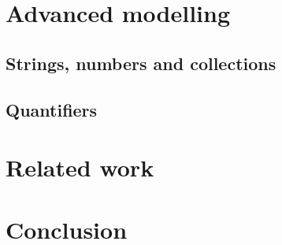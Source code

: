 \section{Advanced modelling}

\subsection{Strings, numbers and collections}

\subsection{Quantifiers}

\section{Related work}

\section{Conclusion}

